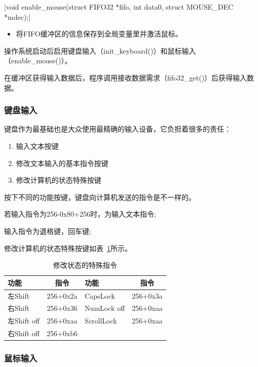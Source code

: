 \csingle|void enable_mouse(struct FIFO32 *fifo, int data0, struct MOUSE_DEC *mdec);|
\begin{itemize}
  \item 将FIFO缓冲区的信息保存到全局变量里并激活鼠标。\\
\end{itemize}

操作系统启动后启用键盘输入（init\_keyboard()）和鼠标输入（enable\_mouse()）。

在缓冲区获得输入数据后，程序调用接收数据需求（fifo32\_get()）后获得输入数据。

\subsubsection{键盘输入}

键盘作为最基础也是大众使用最精确的输入设备，它负担着很多的责任：
\begin{enumerate}
\item 输入文本按键
\item 修改文本输入的基本指令按键
\item 修改计算机的状态特殊按键
\end{enumerate}

按下不同的功能按键，键盘向计算机发送的指令是不一样的。

若输入指令为256-0x80+256时，为输入文本指令;

输入指令为退格键，回车键;

修改计算机的状态特殊按键如表~\ref{tab:spccmd}所示。
\begin{table}[!ht]
  \centering
  \begin{tabular}{lc|lc}
    \hline 功能 & 指令 & 功能 & 指令 \\
    \hline 左Shift & 256+0x2a & CapsLock & 256+0x3a \\ 
     右Shift & 256+0x36 & NumLock off & 256+0xaa \\
     左Shift off & 256+0xaa & ScrollLock & 256+0xaa \\
     右Shift off & 256+0xb6 & & \\
    \hline
  \end{tabular}
  \caption{修改状态的特殊指令}
  \label{tab:spccmd}
\end{table}


\subsubsection{鼠标输入}

